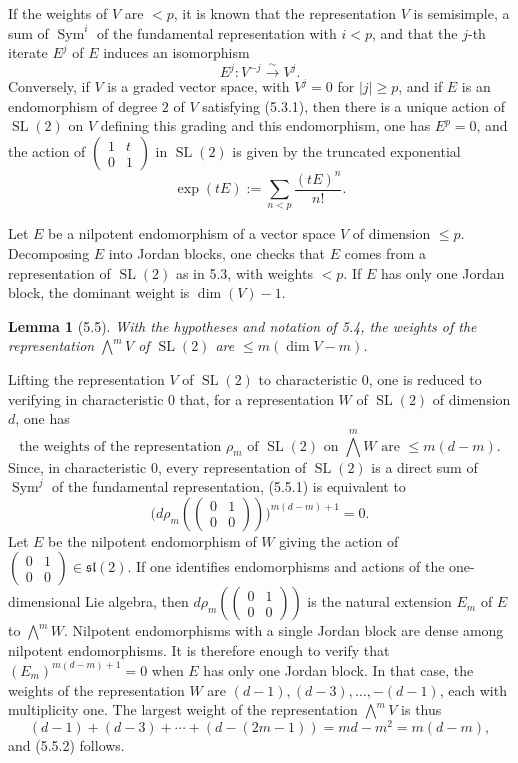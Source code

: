 \documentclass[10pt]{article}
\newcommand{\SL}{\operatorname{SL}}
\theoremstyle{deligne}
\newtheorem*{lemma*}{Lemma}
\newcommand{\heading}[1]{\vspace{0.7em}\noindent{\bfseries #1}\quad}
\begin{document}
If the weights of \(V\) are \(<p\), it is known that the representation \(V\) is semisimple, a sum of \(\operatorname{Sym}^i\) of the fundamental representation with \(i<p\), and that the \(j\)-th iterate \(E^j\) of \(E\) induces an isomorphism
\[
\tag{5.3.1}
  E^j:V^{-j}\overset{\sim}{\longrightarrow}V^j.
\]
Conversely, if \(V\) is a graded vector space, with \(V^j=0\) for \(|j|\ge p\), and if \(E\) is an endomorphism of degree \(2\) of \(V\) satisfying (5.3.1), then there is a unique action of \(\SL(2)\) on \(V\) defining this grading and this endomorphism, one has \(E^p=0\), and the action of \(\begin{pmatrix}1&t\\0&1\end{pmatrix}\) in \(\SL(2)\) is given by the truncated exponential
\[
\tag{5.3.2}
  \exp(tE):=\sum_{n<p}\frac{(tE)^n}{n!}.
\]

\heading{5.4.}
Let \(E\) be a nilpotent endomorphism of a vector space \(V\) of dimension \(\le p\). Decomposing \(E\) into Jordan blocks, one checks that \(E\) comes from a representation of \(\SL(2)\) as in 5.3, with weights \(<p\). If \(E\) has only one Jordan block, the dominant weight is \(\dim(V)-1\).

\begin{lemma*}[5.5]
With the hypotheses and notation of 5.4, the weights of the representation \(\bigwedge^m V\) of \(\SL(2)\) are \(\le m(\dim V-m)\).
\end{lemma*}

Lifting the representation \(V\) of \(\SL(2)\) to characteristic \(0\), one is reduced to verifying in characteristic \(0\) that, for a representation \(W\) of \(\SL(2)\) of dimension \(d\), one has
\[
\tag{5.5.1}
  \text{the weights of the representation }\rho_m\text{ of }\SL(2)\text{ on }\bigwedge^m W\text{ are }\le m(d-m).
\]
Since, in characteristic \(0\), every representation of \(\SL(2)\) is a direct sum of \(\operatorname{Sym}^j\) of the fundamental representation, (5.5.1) is equivalent to
\[
\tag{5.5.2}
  \bigl(d\rho_m(\begin{pmatrix}0&1\\0&0\end{pmatrix})\bigr)^{m(d-m)+1}=0.
\]
Let \(E\) be the nilpotent endomorphism of \(W\) giving the action of \(\begin{pmatrix}0&1\\0&0\end{pmatrix}\in\mathfrak{sl}(2)\). If one identifies endomorphisms and actions of the one-dimensional Lie algebra, then \(d\rho_m(\begin{pmatrix}0&1\\0&0\end{pmatrix})\) is the natural extension \(E_m\) of \(E\) to \(\bigwedge^m W\). Nilpotent endomorphisms with a single Jordan block are dense among nilpotent endomorphisms. It is therefore enough to verify that \((E_m)^{m(d-m)+1}=0\) when \(E\) has only one Jordan block. In that case, the weights of the representation \(W\) are \((d-1),(d-3),\ldots,-(d-1)\), each with multiplicity one. The largest weight of the representation \(\bigwedge^m V\) is thus
\[
  (d-1)+(d-3)+\cdots+(d-(2m-1))=md-m^2=m(d-m),
\]
and (5.5.2) follows.
\end{document}
